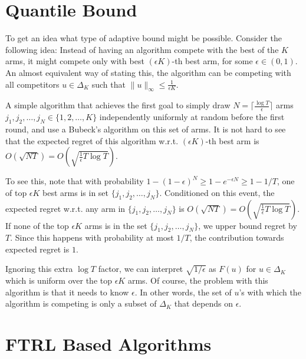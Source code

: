 \documentclass[12pt]{article}
\newcommand{\norm}[1]{\|#1\|}
\begin{document}
\section{Quantile Bound}

To get an idea what type of adaptive bound might be possible. Consider the
following idea: Instead of having an algorithm compete with the best of the $K$
arms, it might compete only with best $(\epsilon K)$-th best arm, for some
$\epsilon \in (0,1)$. An almost equivalent way of stating this, the algorithm
can be competing with all competitors $u \in \Delta_K$ such that
$\norm{u}_\infty \le \frac{1}{\epsilon K}$.

A simple algorithm that achieves the first goal to simply draw $N = \lceil
\frac{\log T}{\epsilon} \rceil$ arms $j_1, j_2, \dots, j_N \in \{1,2, \dots,
K\}$ independently uniformly at random before the first round, and use a
Bubeck's algorithm on this set of arms. It is not hard to see that the expected
regret of this algorithm w.r.t. $(\epsilon K)$-th best arm is $O(\sqrt{N T}) =
O \left(\sqrt{\frac{1}{\epsilon} T \log T} \right)$.

To see this, note that with probability $1 - (1-\epsilon)^N \ge 1 -
e^{-\epsilon N} \ge 1 - 1/T$, one of top $\epsilon K$ best arms is in set
$\{j_1, j_2, \dots, j_N\}$. Conditioned on this event, the expected regret
w.r.t.  any arm in $\{j_1, j_2, \dots, j_N\}$ is $O(\sqrt{NT}) =
O\left(\sqrt{\frac{1}{\epsilon} T \log T}\right)$.  If none of the top $\epsilon K$
arms is in the set $\{j_1, j_2, \dots, j_N\}$, we upper bound regret by $T$.
Since this happens with probability at most $1/T$, the contribution towards
expected regret is $1$.

Ignoring this extra $\log T$ factor, we can interpret $\sqrt{1/\epsilon}$ as
$F(u)$ for $u \in \Delta_K$ which is uniform over the top $\epsilon K$ arms.
Of course, the problem with this algorithm is that it needs to know $\epsilon$.
In other words, the set of $u$'s with which the algorithm is competing is only
a subset of $\Delta_K$ that depends on $\epsilon$.

\section{FTRL Based Algorithms}
\end{document}
